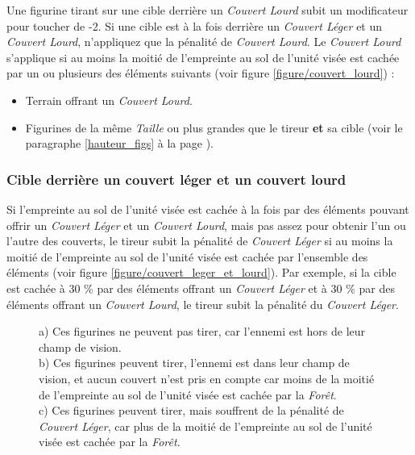 Une figurine tirant sur une cible derrière un \emph{Couvert Lourd} subit un modificateur pour toucher de -2. Si une cible est à la fois derrière un \emph{Couvert Léger} et un \emph{Couvert Lourd}, n'appliquez que la pénalité de \emph{Couvert Lourd}. Le \emph{Couvert Lourd} s'applique si au moins la moitié de l'empreinte au sol de l'unité visée est cachée par un ou plusieurs des éléments suivants (voir figure \ref{figure/couvert_lourd}) :
\begin{itemize}[label={-}]
\item Terrain offrant un \emph{Couvert Lourd}.
\item Figurines de la même \emph{Taille} ou plus grandes que le tireur \textbf{et} sa cible (voir le paragraphe \ref{hauteur_figs} à la page \pageref{hauteur_figs}).
\end{itemize}

\subsubsection*{Cible derrière un couvert léger et un couvert lourd}

Si l'empreinte au sol de l'unité visée est cachée à la fois par des éléments pouvant offrir un \emph{Couvert Léger} et un \emph{Couvert Lourd}, mais pas assez pour obtenir l'un ou l'autre des couverts, le tireur subit la pénalité de \emph{Couvert Léger} si au moins la moitié de l'empreinte au sol de l'unité visée est cachée par l'ensemble des éléments (voir figure \ref{figure/couvert_leger_et_lourd}). Par exemple, si la cible est cachée à 30 \% par des éléments offrant un \emph{Couvert Léger} et à 30 \% par des éléments offrant un \emph{Couvert Lourd}, le tireur subit la pénalité du \emph{Couvert Léger}.

\begin{figure}[!htbp]
\centering
\def\svgwidth{\columnwidth}

\caption{a) Ces figurines ne peuvent pas tirer, car l'ennemi est hors de leur champ de vision. \\
b) Ces figurines peuvent tirer, l'ennemi est dans leur champ de vision, et aucun couvert n'est pris en compte car moins de la moitié de l'empreinte au sol de l'unité visée est cachée par la \emph{Forêt}. \\
c) Ces figurines peuvent tirer, mais souffrent de la pénalité de \emph{Couvert Léger}, car plus de la moitié de l'empreinte au sol de l'unité visée est cachée par la \emph{Forêt}.}
\label{figure/couvert_leger}
\end{figure}

